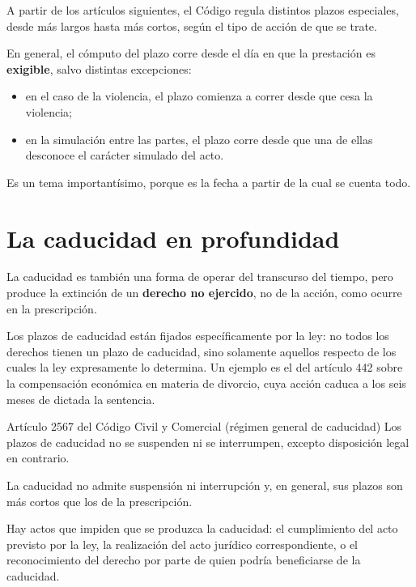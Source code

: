\documentclass[12pt,oneside]{book}
\begin{document}
A partir de los artículos siguientes, el Código regula distintos plazos especiales, desde más largos hasta más cortos, según el tipo de acción de que se trate.

En general, el cómputo del plazo corre desde el día en que la prestación es \textbf{exigible}, salvo distintas excepciones:
\begin{itemize}
    \item en el caso de la violencia, el plazo comienza a correr desde que cesa la violencia;
    \item en la simulación entre las partes, el plazo corre desde que una de ellas desconoce el carácter simulado del acto.
\end{itemize}

\begin{important}
Es un tema importantísimo, porque es la fecha a partir de la cual se cuenta todo.
\end{important}

\section{La caducidad en profundidad}

La caducidad es también una forma de operar del transcurso del tiempo, pero produce la extinción de un \textbf{derecho no ejercido}, no de la acción, como ocurre en la prescripción.

Los plazos de caducidad están fijados específicamente por la ley: no todos los derechos tienen un plazo de caducidad, sino solamente aquellos respecto de los cuales la ley expresamente lo determina. Un ejemplo es el del artículo 442 sobre la compensación económica en materia de divorcio, cuya acción caduca a los seis meses de dictada la sentencia.

\begin{articulo}{Artículo 2567 del Código Civil y Comercial (régimen general de caducidad)}
Los plazos de caducidad no se suspenden ni se interrumpen, excepto disposición legal en contrario.
\end{articulo}

La caducidad no admite suspensión ni interrupción y, en general, sus plazos son más cortos que los de la prescripción.

Hay actos que impiden que se produzca la caducidad: el cumplimiento del acto previsto por la ley, la realización del acto jurídico correspondiente, o el reconocimiento del derecho por parte de quien podría beneficiarse de la caducidad.
\end{document}

